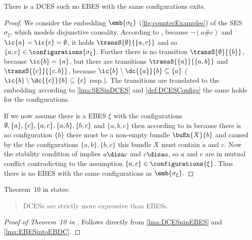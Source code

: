 \documentclass[runningheads,a4paper]{llncs}
\begin{document}
\begin{lemma}
\label{lma:DCESninEBES}
There is a DCES such no EBES with the same configurations exits.
\end{lemma}
\begin{proof}
We consider the embedding $\emb{\sigma_\xi}$ (\cf \fig\ref{fig:counterExamples}) of the SES $\sigma_\xi$, which models disjunctive causality. According to , because $\neg(a\#c)$ and $\ic{a}=\ic{c}=\emptyset$, it holds $\transS{\emptyset}{\{a,c\}}$ and so $\{a,c\}\in\configurations{\sigma_\xi}$. Further there is no transition $\transS{\emptyset}{\{b\}}$, because $\ic{b}=\{a\}$, but there are transitions $\transS{\{a\}}{\{a,b\}}$ and $\transS{\{c\}}{\{c,b\}}$, because $\ic{b}\setminus\dc{\{a\}}{b}\subseteq\{a\}$ ($\ic{b}\setminus\dc{\{c\}}{b}\subseteq\{c\}$ resp.). The transitions are translated to the embedding according to \lem\ref{lma:SESinDCES} and \ref{def:DCESConfigs} the same holds for the configurations. 

If we now assume there is a EBES $\xi$ with the configurations $\emptyset,\{a\},\{c\},\{a,c\},\\\{a,b\},\{b,c\}$ and $\{a,b,c\}$ then according to  in \cite{dynamicCausality15} because there is no configuration $\{b\}$ there must be a non-empty bundle $\buEn{X}{b}$ and caused by the the configurations $\{a,b\},\{b,c\}$ this bundle $X$ must contain $a$ and $c$. Now the stability condition of  implies $a\disa c$ and $c\disa a$, so $a$ and $c$ are in mutual conflict contradicting to the assumption $\{a,c\}\in\configurations{\xi}$. Thus there is no EBES with the same configurations as $\emb{\sigma_\xi}.$
\end{proof}

Theorem~10 in \cite{dynamicCausality15} states:
\begin{quote}
DCESs are strictly more expressive than EBESs.
\end{quote}

\begin{proof}[Proof of Theorem~10 in \cite{dynamicCausality15}]
Follows directly from \lems\ref{lma:DCESninEBES} and \ref{lma:EBESintoEBDC}.
\end{proof}



\end{document}
